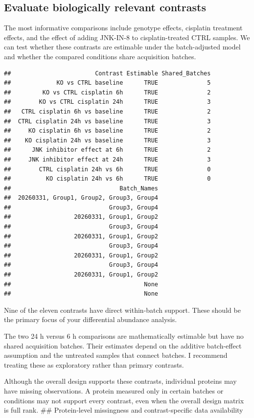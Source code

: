 \documentclass[
  10pt,
]{article}
\begin{document}
\subsection{Evaluate biologically relevant
contrasts}\label{evaluate-biologically-relevant-contrasts}

The most informative comparisons include genotype effects, cisplatin
treatment effects, and the effect of adding JNK-IN-8 to
cisplatin-treated CTRL samples. We can test whether these contrasts are
estimable under the batch-adjusted model and whether the compared
conditions share acquisition batches.

\begin{verbatim}
##                        Contrast Estimable Shared_Batches
##             KO vs CTRL baseline      TRUE              5
##         KO vs CTRL cisplatin 6h      TRUE              2
##        KO vs CTRL cisplatin 24h      TRUE              3
##   CTRL cisplatin 6h vs baseline      TRUE              2
##  CTRL cisplatin 24h vs baseline      TRUE              3
##     KO cisplatin 6h vs baseline      TRUE              2
##    KO cisplatin 24h vs baseline      TRUE              3
##      JNK inhibitor effect at 6h      TRUE              2
##     JNK inhibitor effect at 24h      TRUE              3
##        CTRL cisplatin 24h vs 6h      TRUE              0
##          KO cisplatin 24h vs 6h      TRUE              0
##                               Batch_Names
##  20260331, Group1, Group2, Group3, Group4
##                            Group3, Group4
##                  20260331, Group1, Group2
##                            Group3, Group4
##                  20260331, Group1, Group2
##                            Group3, Group4
##                  20260331, Group1, Group2
##                            Group3, Group4
##                  20260331, Group1, Group2
##                                      None
##                                      None
\end{verbatim}

Nine of the eleven contrasts have direct within-batch support. These
should be the primary focus of your differential abundance analysis.

The two 24 h versus 6 h comparisons are mathematically estimable but
have no shared acquisition batches. Their estimates depend on the
additive batch-effect assumption and the untreated samples that connect
batches. I recommend treating these as exploratory rather than primary
contrasts.

Although the overall design supports these contrasts, individual
proteins may have missing observations. A protein measured only in
certain batches or conditions may not support every contrast, even when
the overall design matrix is full rank. \#\# Protein-level missingness
and contrast-specific data availability
\end{document}
